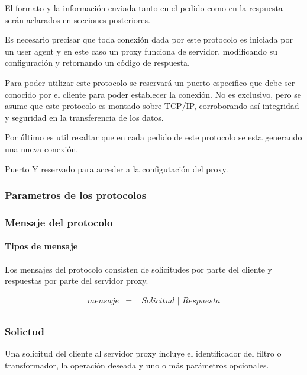 \documentclass[a4paper,10pt]{article}
\begin{document}
        El formato y la informaci\'on enviada tanto en el pedido como en la respuesta ser\'an 
        aclarados en secciones posteriores.

        Es necesario precisar que toda conexi\'on dada por este protocolo es iniciada por un user 
        agent y en este caso un proxy funciona de servidor, modificando su configuraci\'on y retornando 
        un c\'odigo de respuesta.

        Para poder utilizar este protocolo se reservar\'a un puerto especifico que debe ser conocido 
        por el cliente para poder establecer la conexi\'on. No es exclusivo, pero se asume que este 
        protocolo es montado sobre TCP/IP, corroborando as\'i integridad y seguridad en la transferencia 
        de los datos.

        Por \'ultimo es util resaltar que en cada pedido de este protocolo se esta generando una nueva 
        conexi\'on.

    Puerto Y reservado para acceder a la configutaci\'on del proxy.

        \subsubsection{Parametros de los protocolos}


        \subsubsection{Mensaje del protocolo}

            \paragraph*{Tipos de mensaje}
            Los mensajes del protocolo consisten de solicitudes por parte del cliente y respuestas por parte del servidor proxy.

            \begin{eqnarray*}
                mensaje  & = &\,\,Solicitud\,\,|\,\,Respuesta\nonumber\\
            \end{eqnarray*}


        \subsubsection{Solictud}
        Una solicitud del cliente al servidor proxy incluye el identificador del filtro o transformador, la operaci\'on deseada y uno o m\'as par\'ametros opcionales.
\end{document}
